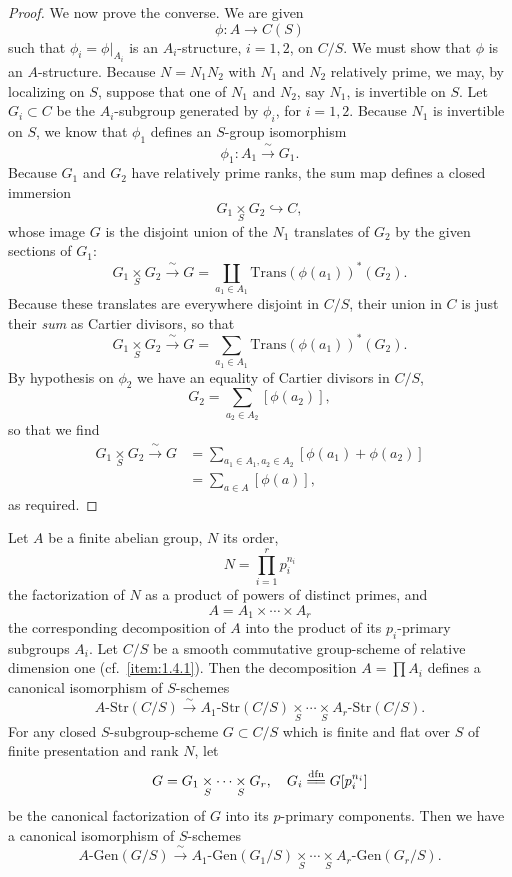 \begin{proof}
We now prove the converse. We are given
\[
\phi : A \to C(S)
\]
such that $\phi_i = \phi|_{A_i}$ is an $A_i$-structure, $i = 1, 2$, on $C/S$. We must show that $\phi$ is an $A$-structure. Because $N = N_1 N_2$ with $N_1$ and $N_2$ relatively prime, we may, by localizing on $S$, suppose that one of $N_1$ and $N_2$, say $N_1$, is invertible on $S$. Let $G_i \subset C$ be the $A_i$-subgroup generated by $\phi_i$, for $i = 1, 2$. Because $N_1$ is invertible on $S$, we know that $\phi_1$ defines an $S$-group isomorphism
\[
\phi_1 : A_1 \xrightarrow{\ \sim\ } G_1.
\]
Because $G_1$ and $G_2$ have relatively prime ranks, the sum map defines a closed immersion
\[
G_1 \underset{S}{\times} G_2 \hookrightarrow C,
\]
whose image $G$ is the disjoint union of the $N_1$ translates of $G_2$ by the given sections of $G_1$:
\[
G_1 \underset{S}{\times} G_2 \xrightarrow{\ \sim\ } G = \coprod_{a_1 \in A_1} \mathrm{Trans}(\phi(a_1))^*(G_2).
\]
Because these translates are everywhere disjoint in $C/S$, their union in $C$ is just their \emph{sum} as Cartier divisors, so that
\[
G_1 \underset{S}{\times} G_2 \xrightarrow{\ \sim\ } G = \sum_{a_1 \in A_1} \mathrm{Trans}(\phi(a_1))^*(G_2).
\]
By hypothesis on $\phi_2$ we have an equality of Cartier divisors in $C/S$,
\[
G_2 = \sum_{a_2 \in A_2} [\phi(a_2)],
\]
so that we find
\begin{align*}
G_1 \underset{S}{\times} G_2 \xrightarrow{\ \sim\ } G &= \sum_{a_1 \in A_1, a_2 \in A_2} [\phi(a_1) + \phi(a_2)] \\
&= \sum_{a \in A} [\phi(a)],
\end{align*}
as required.
\end{proof}

\begin{corollary}\label{cor:1.7.3}
Let $A$ be a finite abelian group, $N$ its order,
\[
N = \prod_{i=1}^r p_i^{n_i}
\]
the factorization of $N$ as a product of powers of distinct primes, and
\[
A = A_1 \times \cdots \times A_r
\]
the corresponding decomposition of $A$ into the product of its $p_i$-primary subgroups $A_i$. Let $C/S$ be a smooth commutative group-scheme of relative dimension one (cf.~\ref{item:1.4.1}). Then the decomposition $A = \prod A_i$ defines a canonical isomorphism of $S$-schemes
\[
A\text{-}\mathrm{Str}(C/S) \xrightarrow{\ \sim\ } A_1\text{-}\mathrm{Str}(C/S) \underset{S}{\times} \cdots \underset{S}{\times} A_r\text{-}\mathrm{Str}(C/S).
\]
For any closed $S$-subgroup-scheme $G \subset C/S$ which is finite and flat over $S$ of finite presentation and rank $N$, let
\[
G = G_1 \underset{S}{\times} \cdots \underset{S}{\times} G_r, \quad G_i \xlongequal{dfn} G[p_i^{n_i}]
\]
be the canonical factorization of $G$ into its $p$-primary components. Then we have a canonical isomorphism of $S$-schemes
\[
A\text{-}\mathrm{Gen}(G/S) \xrightarrow{\ \sim\ } A_1\text{-}\mathrm{Gen}(G_1/S) \underset{S}{\times} \cdots \underset{S}{\times} A_r\text{-}\mathrm{Gen}(G_r/S).
\]
\end{corollary}

